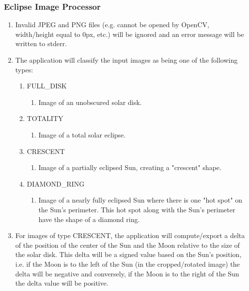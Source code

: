 \documentclass[10pt, onecolumn, draftclsnofoot, letterpaper, compsoc]{IEEEtran}
\begin{document}
\subsubsection{Eclipse Image Processor}
	\begin{enumerate}
		\item Invalid JPEG and PNG files (e.g. cannot be opened by OpenCV, 
		width/height equal to 0px, etc.) will be ignored and an error message 
		will be written to stderr.

		\item The application will classify the input images as being one of
		the following types:
		\begin{enumerate}
			\item FULL\_DISK
			\begin{enumerate}
				\item Image of an unobscured solar disk.
			\end{enumerate}

			\item TOTALITY
			\begin{enumerate}
				\item Image of a total solar eclipse.
			\end{enumerate}

			\item CRESCENT
			\begin{enumerate}
				\item Image of a partially eclipsed Sun, creating a "crescent" 
				shape.
			\end{enumerate}

			\item DIAMOND\_RING
			\begin{enumerate}
				\item Image of a nearly fully eclipsed Sun where there is one 
				"hot spot" on the Sun's perimeter. This hot spot along with the 
				Sun's perimeter have the shape of a diamond ring.
			\end{enumerate}
		\end{enumerate}

		\item For images of type CRESCENT, the application will compute/export 
		a delta of the position of the center of the Sun and the 
		Moon relative to the size of the solar disk. This delta will be a 
		signed value based on the Sun's position, i.e. if the Moon is to 
		the left of the Sun (in the cropped/rotated image) the delta will 
		be negative and conversely, if the Moon is to the right of the Sun 
		the delta value will be positive.


\end{enumerate}
\end{document}
